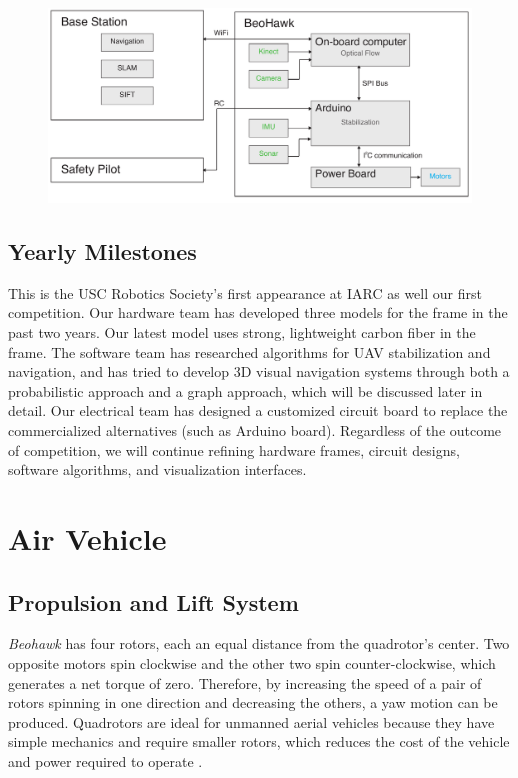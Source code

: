 \documentclass[12pt, letterpaper]{article}
\begin{document}
\begin{figure}[h]
\centering
\includegraphics[width=14cm]{images/beohawk-system-arch.pdf}
\label{fig:architecture}
\end{figure}

\subsection{Yearly Milestones}

This is the USC Robotics Society's first appearance at IARC as well our first competition. Our hardware team has developed three models for the frame in the past two years. Our latest model uses strong, lightweight carbon fiber in the frame. The software team has researched algorithms for UAV stabilization and navigation, and has tried to develop 3D visual navigation systems through both a probabilistic approach and a graph approach, which will be discussed later in detail. Our electrical team has designed a customized circuit board to replace the commercialized alternatives (such as Arduino board). Regardless of the outcome of competition, we will continue refining hardware frames, circuit designs, software algorithms, and visualization interfaces.


\section{Air Vehicle}

\subsection{Propulsion and Lift System}
\emph{Beohawk} has four rotors, each an equal distance from the quadrotor's center.  Two opposite motors spin clockwise and the other two spin counter-clockwise, which generates a net torque of zero.  Therefore, by increasing the speed of a pair of rotors spinning in one direction and decreasing the others, a yaw motion can be produced. Quadrotors are ideal for unmanned aerial vehicles because they have simple mechanics and require smaller rotors, which reduces the cost of the vehicle and power required to operate \cite{bib:quadrotor}.
\end{document}
